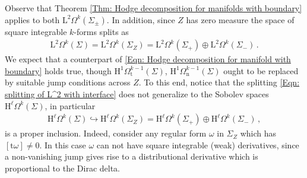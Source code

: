 Observe that Theorem \ref{Thm: Hodge decomposition for manifolds with boundary} applies to both $\mathrm{L}^2\Omega^k(\Sigma_\pm)$.
In addition, since $Z$ has zero measure the space of square integrable $k$-forms splits as
\begin{align}\label{Eqn: splitting of L^2 with interface}
	\mathrm{L}^2\Omega^k(\Sigma)=
	\mathrm{L}^2\Omega^k(\Sigma_Z)=
	\mathrm{L}^2\Omega^k(\Sigma_+)\oplus\mathrm{L}^2\Omega^k(\Sigma_-)\,.
\end{align}
We expect that a counterpart of \eqref{Eqn: Hodge decomposition for manifold with boundary} holds true, though $\mathrm{H}^1\Omega^{k-1}_{\mathrm{t}}(\Sigma)$, $\mathrm{H}^1\Omega^{k-1}_{\mathrm{n}}(\Sigma)$ ought to be replaced by suitable jump conditions across $Z$.
To this end, notice that the splitting \eqref{Eqn: splitting of L^2 with interface} does not generalize to the Sobolev spaces $\mathrm{H}^\ell\Omega^k(\Sigma)$, in particular
\begin{align}
	\mathrm{H}^\ell\Omega^k(\Sigma)\hookrightarrow
	\mathrm{H}^\ell\Omega^k(\Sigma_Z)=
	\mathrm{H}^\ell\Omega^k(\Sigma_+)\oplus\mathrm{H}^\ell\Omega^k(\Sigma_-)\,,
\end{align}
is a proper inclusion. Indeed, consider any regular form $\omega$ in $\Sigma_Z$ which has $[\mathrm{t}\omega]\neq 0$. In this case $\omega$ can not have square integrable (weak) derivatives, since a non-vanishing jump gives rise to a distributional derivative which is proportional to the Dirac delta.

